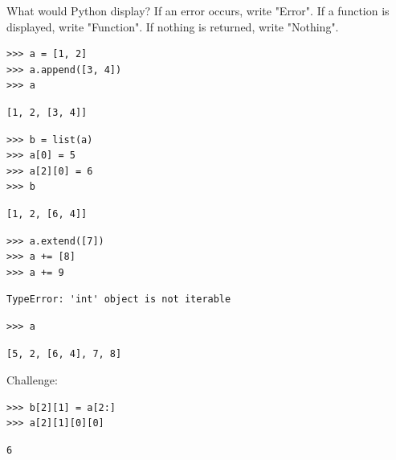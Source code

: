 \begin{blocksection}
\question What would Python display? If an error occurs, write "Error". If a function is displayed, write "Function". If nothing is returned, write "Nothing".

\begin{lstlisting}
>>> a = [1, 2]
>>> a.append([3, 4])
>>> a
\end{lstlisting}
\begin{solution}[0.25in]
\begin{lstlisting}
[1, 2, [3, 4]]
\end{lstlisting}
\end{solution}
\end{blocksection}

\begin{lstlisting}
>>> b = list(a)
>>> a[0] = 5
>>> a[2][0] = 6
>>> b
\end{lstlisting}
\begin{solution}[0.25in]
\begin{lstlisting}
[1, 2, [6, 4]]
\end{lstlisting}
\end{solution}

\begin{lstlisting}
>>> a.extend([7])
>>> a += [8]
>>> a += 9
\end{lstlisting}
\begin{solution}[0.25in]
\begin{lstlisting}
TypeError: 'int' object is not iterable
\end{lstlisting}
\end{solution}

\begin{lstlisting}
>>> a
\end{lstlisting}
\begin{solution}[0.25in]
\begin{lstlisting}
[5, 2, [6, 4], 7, 8]
\end{lstlisting}
\end{solution}

Challenge:
\begin{lstlisting}
>>> b[2][1] = a[2:]
>>> a[2][1][0][0]
\end{lstlisting}
\begin{solution}[0.25in]
\begin{lstlisting}
6
\end{lstlisting}
\end{solution}

